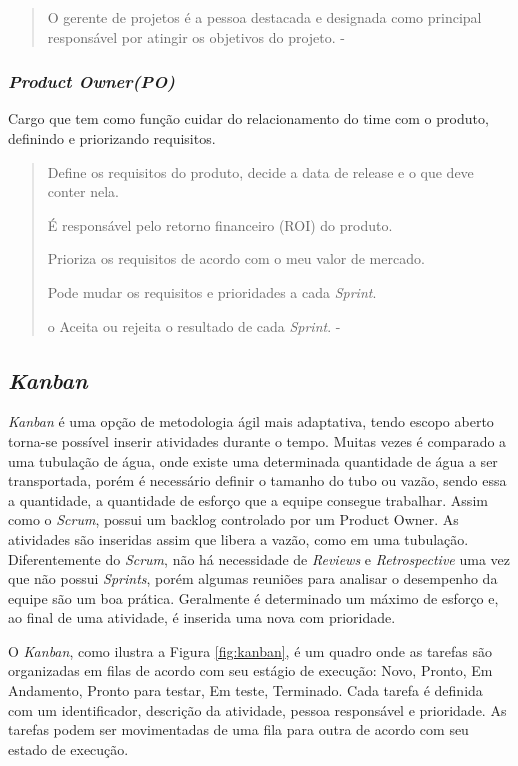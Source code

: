 \begin{quote}
  O gerente de projetos é a pessoa destacada e designada como principal responsável por atingir os objetivos do projeto. - \cite{cruz2013scrum}
\end{quote}
\subsubsection{\textit{Product Owner(PO)}}
\label{sec:po}
Cargo que tem como função cuidar do relacionamento do time com o produto,
 definindo e priorizando requisitos.
 
 \begin{quote}
  Define os requisitos do
  produto, decide a data de
  release e o que deve conter
  nela.

  É responsável pelo retorno
  financeiro (ROI) do produto.
  
  Prioriza os requisitos de
  acordo com o meu valor de
  mercado.
  
  Pode mudar os requisitos e
  prioridades a cada \textit{Sprint}.

  o Aceita ou rejeita o resultado de
  cada \textit{Sprint}. - \cite{sabbagh2014scrum}
 \end{quote}

\subsection{\textit{Kanban}}
\textit{Kanban} é uma opção de metodologia ágil mais adaptativa, tendo escopo aberto torna-se possível inserir atividades durante o tempo.
Muitas vezes é comparado a uma tubulação de água, onde existe uma determinada quantidade de água a ser transportada, porém é necessário definir o tamanho do tubo ou vazão, sendo essa a quantidade, a quantidade de esforço que a equipe consegue trabalhar.
Assim como o \textit{Scrum}, possui um backlog controlado por um Product Owner. As atividades são inseridas assim que libera a vazão, como em uma tubulação.
Diferentemente do \textit{Scrum}, não há necessidade de \textit{Reviews} e \textit{Retrospective} uma vez que não possui \textit{Sprints}, porém algumas reuniões para analisar o desempenho da equipe são um boa prática.
Geralmente é determinado um máximo de esforço e, ao final de uma atividade, é inserida uma nova com prioridade.

O \textit{Kanban}, como ilustra a Figura \ref{fig:kanban}, é um quadro onde as tarefas são organizadas em filas de acordo com seu estágio de execução: Novo, Pronto, Em Andamento, Pronto para testar, Em teste, Terminado.
Cada  tarefa é definida com um identificador, descrição da atividade, pessoa responsável e prioridade. As tarefas podem ser movimentadas de uma fila para outra de acordo com seu estado de execução.

